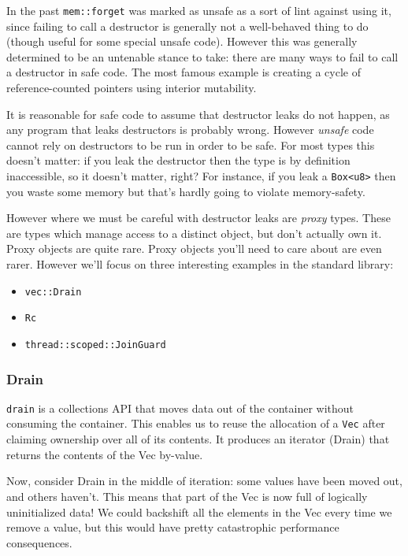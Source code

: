 \documentclass[a4paper,]{book}
\providecommand{\tightlist}{%
  \setlength{\itemsep}{0pt}\setlength{\parskip}{0pt}}
\begin{document}
In the past \texttt{mem::forget} was marked as unsafe as a sort of lint
against using it, since failing to call a destructor is generally not a
well-behaved thing to do (though useful for some special unsafe code).
However this was generally determined to be an untenable stance to take:
there are many ways to fail to call a destructor in safe code. The most
famous example is creating a cycle of reference-counted pointers using
interior mutability.

It is reasonable for safe code to assume that destructor leaks do not
happen, as any program that leaks destructors is probably wrong. However
\emph{unsafe} code cannot rely on destructors to be run in order to be
safe. For most types this doesn't matter: if you leak the destructor
then the type is by definition inaccessible, so it doesn't matter,
right? For instance, if you leak a
\texttt{Box\textless{}u8\textgreater{}} then you waste some memory but
that's hardly going to violate memory-safety.

However where we must be careful with destructor leaks are \emph{proxy}
types. These are types which manage access to a distinct object, but
don't actually own it. Proxy objects are quite rare. Proxy objects
you'll need to care about are even rarer. However we'll focus on three
interesting examples in the standard library:

\begin{itemize}
\tightlist
\item
  \texttt{vec::Drain}
\item
  \texttt{Rc}
\item
  \texttt{thread::scoped::JoinGuard}
\end{itemize}

\subsubsection{Drain}\label{drain}

\texttt{drain} is a collections API that moves data out of the container
without consuming the container. This enables us to reuse the allocation
of a \texttt{Vec} after claiming ownership over all of its contents. It
produces an iterator (Drain) that returns the contents of the Vec
by-value.

Now, consider Drain in the middle of iteration: some values have been
moved out, and others haven't. This means that part of the Vec is now
full of logically uninitialized data! We could backshift all the
elements in the Vec every time we remove a value, but this would have
pretty catastrophic performance consequences.
\end{document}
